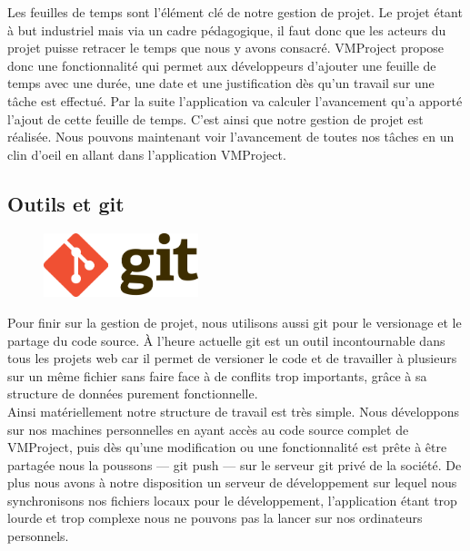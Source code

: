 \documentclass[12pt]{report}
\begin{document}
Les feuilles de temps sont l’élément clé de notre gestion de projet. Le projet étant à but industriel mais via un cadre pédagogique, il faut donc que les acteurs du projet puisse retracer le temps que nous y avons consacré. VMProject propose  donc une fonctionnalité qui permet aux développeurs d’ajouter une feuille de temps avec une durée, une date et une justification dès qu’un travail sur une tâche est effectué. Par la suite l’application va calculer l’avancement qu’a apporté l’ajout de cette feuille de temps. C’est ainsi que notre gestion de projet est réalisée. Nous pouvons maintenant voir l’avancement de toutes nos tâches en un clin d’oeil en allant dans l’application VMProject.\\

		\subsection{Outils et git}
		
\begin{figure}[!h]
	\centering
	\includegraphics[width=0.4\textwidth]{pictures/gitlogo.png}
\end{figure}
		
Pour finir sur la gestion de projet, nous utilisons aussi git pour le versionage et le partage du code source. À l’heure actuelle git est un outil incontournable dans tous les projets web car il permet de versioner le code et de travailler à plusieurs sur un même fichier sans faire face à de conflits trop importants, grâce à sa structure de données purement fonctionnelle.\\

Ainsi matériellement notre structure de travail est très simple. Nous développons sur nos machines personnelles en ayant accès au code source complet de VMProject, puis dès qu’une modification ou une fonctionnalité est prête à être partagée nous la poussons — git push — sur le serveur git privé de la société. De plus nous avons à notre disposition un serveur de développement sur lequel nous synchronisons nos fichiers locaux pour le développement, l’application étant trop lourde et trop complexe nous ne pouvons pas la lancer sur nos ordinateurs personnels.\\
\end{document}
